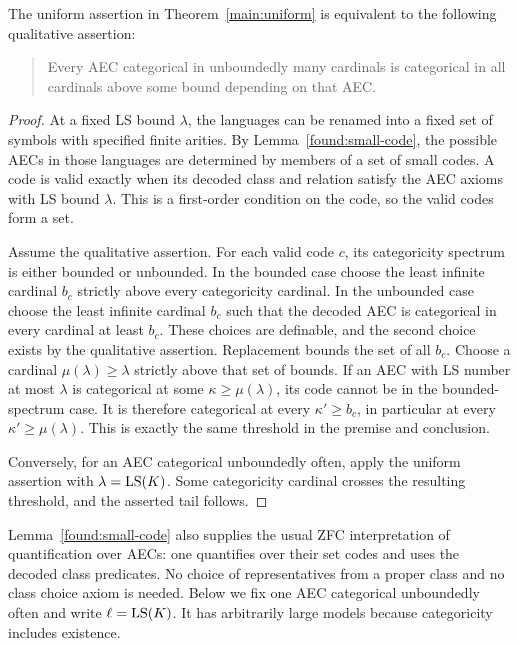 \begin{proposition}
\label{found:uniform-reduction}
The uniform assertion in Theorem~\ref{main:uniform} is equivalent to
the following qualitative assertion:
\begin{quote}
Every AEC categorical in unboundedly many cardinals is categorical in
all cardinals above some bound depending on that AEC.
\end{quote}
\end{proposition}

\begin{proof}
At a fixed LS bound $\lambda$, the languages can be renamed into a
fixed set of symbols with specified finite arities. By
Lemma~\ref{found:small-code}, the possible AECs in those languages are
determined by members of a set of small codes. A code is valid exactly
when its decoded class and relation satisfy the AEC axioms with LS
bound $\lambda$. This is a first-order condition on the code, so the
valid codes form a set.

Assume the qualitative assertion. For each valid code $c$, its
categoricity spectrum is either bounded or unbounded. In the bounded
case choose the least infinite cardinal $b_c$ strictly above every
categoricity cardinal. In the unbounded case choose the least infinite
cardinal $b_c$ such that the decoded AEC is categorical in every
cardinal at least $b_c$. These choices are definable, and the second
choice exists by the qualitative assertion. Replacement bounds the
set of all $b_c$. Choose a cardinal $\mu(\lambda)\geq\lambda$ strictly
above that set of bounds. If an AEC with LS number at most $\lambda$
is categorical at some $\kappa\geq\mu(\lambda)$, its code cannot be
in the bounded-spectrum case. It is therefore categorical at every
$\kappa'\geq b_c$, in particular at every
$\kappa'\geq\mu(\lambda)$. This is exactly the same threshold in
the premise and conclusion.

Conversely, for an AEC categorical unboundedly often, apply the uniform
assertion with $\lambda=\operatorname{LS}(K)$. Some categoricity cardinal crosses
the resulting threshold, and the asserted tail follows.
\end{proof}

\begin{remark}
Lemma~\ref{found:small-code} also supplies the usual ZFC interpretation
of quantification over AECs: one quantifies over their set codes and
uses the decoded class predicates. No choice of representatives from
a proper class and no class choice axiom is needed. Below we fix one
AEC categorical unboundedly often and write $\ell=\operatorname{LS}(K)$. It has
arbitrarily large models because categoricity includes existence.
\end{remark}

